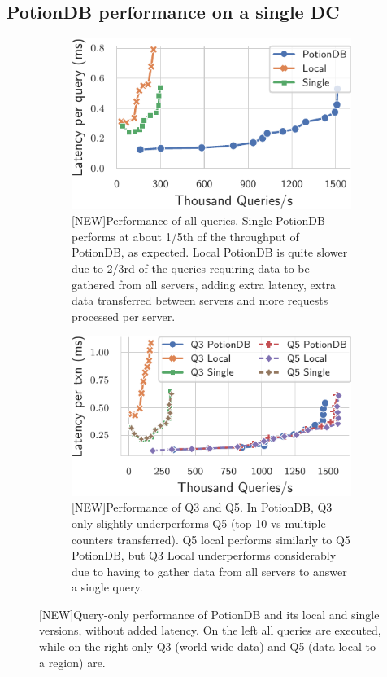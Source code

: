 \documentclass[sigplan,10pt]{acmart}
\begin{document}
\subsection{PotionDB performance on a single DC}

\begin{figure}[h]
	\centering
	\begin{subfigure}{.47\linewidth}
		\includegraphics[width=1\linewidth]{singleQuery/all_queries_noTC}
		\caption{[NEW]Performance of all queries. Single PotionDB performs at about 1/5th of the throughput of PotionDB, as expected. Local PotionDB is quite slower due to 2/3rd of the queries requiring data to be gathered from all servers, adding extra latency, extra data transferred between servers and more requests processed per server.}
		\label{fig:(new)global_local_single_noTC}
	\end{subfigure}%
	\hspace*{3em}
	\begin{subfigure}{.47\linewidth}
		\includegraphics[width=1\linewidth]{singleQuery/q3_q5_noLatency}
		\caption{[NEW]Performance of Q3 and Q5. In PotionDB, Q3 only slightly underperforms Q5 (top 10 vs multiple counters transferred). Q5 local performs similarly to Q5 PotionDB, but Q3 Local underperforms considerably due to having to gather data from all servers to answer a single query.}
		\label{fig:(new)q3_q5_noTC}
	\end{subfigure}
	\caption{[NEW]Query-only performance of PotionDB and its local and single versions, without added latency. On the left all queries are executed, while on the right only Q3 (world-wide data) and Q5 (data local to a region) are.}
\end{figure}
\end{document}
